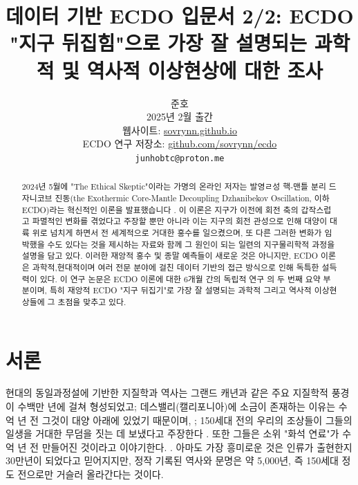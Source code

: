 \documentclass[10pt,twocolumn,letterpaper]{article}
\begin{document}
\title{데이터 기반 ECDO 입문서 2/2: ECDO "지구 뒤집힘"으로 가장 잘 설명되는 과학적 및 역사적 이상현상에 대한 조사}

\author{준호\\
2025년 2월 출간\\
웹사이트: \href{https://sovrynn.github.io}{sovrynn.github.io}\\
ECDO 연구 저장소: \href{https://github.com/sovrynn/ecdo}{github.com/sovrynn/ecdo}\\
{\tt\small junhobtc@proton.me}
}

\maketitle

\begin{abstract}
2024년 5월에 "The Ethical Skeptic"이라는 가명의 온라인 저자는 발영ㄹ성 핵-맨틀 분리 드자니코브 진동(the Exothermic Core-Mantle Decoupling Dzhanibekov Oscillation, 이하 ECDO)라는 혁신적인 이론을 발표했습니다 \cite{0} \cite{1}. 이 이론은 지구가 이전에 회전 축의 갑작스럽고 파멸적인 변화를 겪었다고 주장할 뿐만 아니라 이는 지구의 회전 관성으로 인해 대양이 대륙 위로 넘치게 하면서 전 세계적으로 거대한  홍수를 일으켰으며, 또 다른 그러한 변화가 임박했을 수도 있다는 것을 제시하는 자료와 함께 그 원인이 되는 일련의 지구물리학적 과정을 설명을 담고 있다. 이러한 재앙적 홍수 및 종말 예측들이 새로운 것은 아니지만, ECDO 이론은 과학적,현대적이며 여러 전문 분야에 걸친 데이터 기반의 접근 방식으로 인해 독특한 설득력이 있다. 
이 연구 논문은 ECDO 이론에 대한 6개월 간의 독립적 연구 \cite{2,20}의 두 번째 요약 부분이며, 특히 재앙적 ECDO "지구 뒤집기"로 가장 잘 설명되는 과학적 그리고 역사적 이상현상들에 그 초점을 맞추고 있다.

\end{abstract}


\section{서론}

현대의 동일과정설에 기반한 지질학과 역사는 그랜드 캐년과 같은 주요 지질학적 풍경이 수백만 년에 걸쳐 형성되었고\cite{143}; 데스밸리(캘리포니아)에 소금이 존재하는 이유는 수억 년 전 그것이 대양 아래에 있었기 때문이며, \cite{144}; 150세대 전의 우리의 조상들이 그들의 일생을 거대한 무덤을 짓는 데 보냈다고 주장한다 \cite{29,70}. 또한 그들은 소위 "화석 연료"가 수억 년 전 만들어진 것이라고 이야기한다. \cite{104}. 아마도 가장 흥미로운 것은 인류가 출현한지 30만년이 되었다고 믿어지지만\cite{145}, 정작 기록된 역사와 문명은 약 5,000년, 즉 150세대 정도 전으로만 거슬러 올라간다는 것이다.
\end{document}
